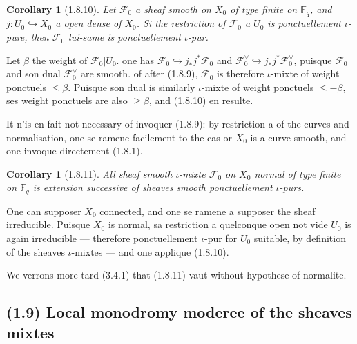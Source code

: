 \documentclass[12pt,a4paper]{article}
\theoremstyle{plain}
\newtheorem{corollary}[theorem]{Corollary}
\theoremstyle{definition}
\theoremstyle{definition}
\theoremstyle{remark}
\begin{document}
\begin{corollary}[1.8.10]
Let $\mathscr{F}_0$ a sheaf smooth on $X_0$ of type finite on $\mathbb{F}_q$, and $j: U_0 \hookrightarrow X_0$ a open dense of $X_0$. Si the restriction of $\mathscr{F}_0$ a $U_0$ is ponctuellement $\iota$-pure, then $\mathscr{F}_0$ lui-same is ponctuellement $\iota$-pur.
\end{corollary}

Let $\beta$ the weight of $\mathscr{F}_0|U_0$. one has $\mathscr{F}_0 \hookrightarrow j_* j^* \mathscr{F}_0$ and $\mathscr{F}_0^\vee \hookrightarrow j_* j^* \mathscr{F}_0^\vee$, puisque $\mathscr{F}_0$ and son dual $\mathscr{F}_0^\vee$ are smooth. of after (1.8.9), $\mathscr{F}_0$ is therefore $\iota$-mixte of weight ponctuels $\leq \beta$. Puisque son dual is similarly $\iota$-mixte of weight ponctuels $\leq -\beta$, ses weight ponctuels are also $\geq \beta$, and (1.8.10) en resulte.

It n'is en fait not necessary of invoquer (1.8.9): by restriction a of the curves and normalisation, one se ramene facilement to the cas or $X_0$ is a curve smooth, and one invoque directement (1.8.1).

\begin{corollary}[1.8.11]
All sheaf smooth $\iota$-mixte $\mathscr{F}_0$ on $X_0$ normal of type finite on $\mathbb{F}_q$ is extension successive of sheaves smooth ponctuellement $\iota$-purs.
\end{corollary}

One can supposer $X_0$ connected, and one se ramene a supposer the sheaf irreducible. Puisque $X_0$ is normal, sa restriction a quelconque open not vide $U_0$ is again irreducible --- therefore ponctuellement $\iota$-pur for $U_0$ suitable, by definition of the sheaves $\iota$-mixtes --- and one applique (1.8.10).

We verrons more tard (3.4.1) that (1.8.11) vaut without hypothese of normalite.

\newpage

\subsection*{(1.9) Local monodromy moderee of the sheaves mixtes}
\end{document}
